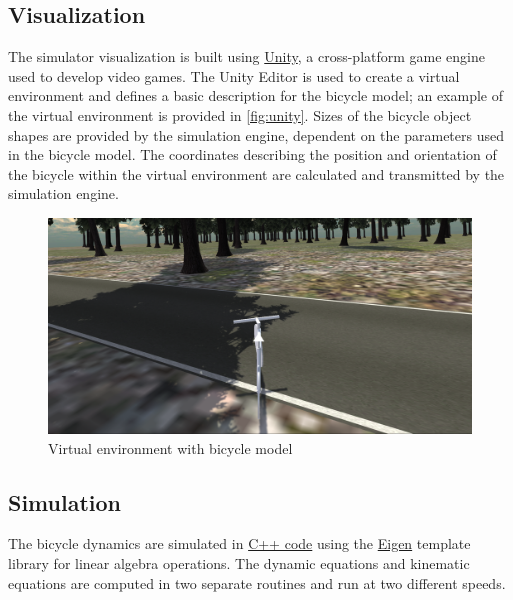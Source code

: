 \documentclass[11pt,a4paper,reqno]{amsart}
\begin{document}
\subsection{Visualization}
The simulator visualization is built using \href{https://unity3d.com/}{Unity}, a cross-platform game engine used to
develop video games.
The Unity Editor is used to create a virtual environment and defines a basic description for the bicycle model;
an example of the virtual environment is provided in \autoref{fig:unity}.
Sizes of the bicycle object shapes are provided by the simulation engine, dependent on the parameters used in the
bicycle model.
The coordinates describing the position and orientation of the bicycle within the virtual environment are calculated and
transmitted by the simulation engine.

\begin{figure}
    \centering
    \includegraphics[width=\textwidth]{screenshot_2015-06-27_19-31-15.png}
    \caption{Virtual environment with bicycle model}
    \label{fig:unity}
\end{figure}

\subsection{Simulation}
The bicycle dynamics are simulated in \href{https://github.com/oliverlee/bicycle}{C++ code} using the
\href{http://eigen.tuxfamily.org/index.php?title=Main_Page}{Eigen}\cite{eigenweb} template library for linear algebra
operations.
The dynamic equations and kinematic equations are computed in two separate routines and run at two different speeds.
\end{document}
